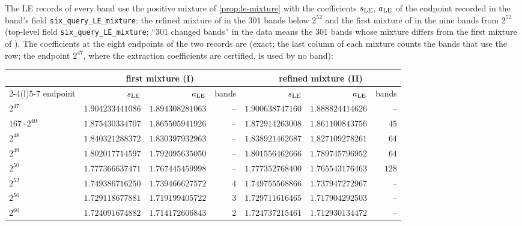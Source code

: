 The LE records of every band use the positive mixture of \cref{prop:le-mixture}
with the coefficients $s_{\rm LE}$, $a_{\rm LE}$ of the endpoint recorded in the
band's field \texttt{six\_query\_LE\_mixture}: the refined mixture of
 in the $301$
bands below $2^{52}$ and the first mixture of  in the nine
bands from $2^{52}$ (top-level field
\texttt{six\_query\_LE\_mixture}; ``$301$ changed bands'' in
the data means the $301$ bands whose mixture differs from the
first mixture of ). The coefficients at the eight endpoints of the two records are (exact; the
last column of each mixture counts the bands that use the row; the endpoint
$2^{47}$, where the extraction coefficients are certified, is used by no band):
\begin{center}\scriptsize\setlength{\tabcolsep}{4pt}
\begin{tabular}{@{}lrrrrrr@{}}
\toprule
 & \multicolumn{3}{c}{first mixture (I)} & \multicolumn{3}{c}{refined mixture (II)}\\
\cmidrule(lr){2-4}\cmidrule(l){5-7}
endpoint & $s_{\rm LE}$ & $a_{\rm LE}$ & bands & $s_{\rm LE}$ & $a_{\rm LE}$ & bands\\
\midrule
$2^{47}$ & $1.904233441086$ & $1.894308281063$ & -- & $1.900638747160$ & $1.888824414626$ & --\\
$167\cdot2^{40}$ & $1.875430334707$ & $1.865505941926$ & -- & $1.872914263008$ & $1.861100843756$ & $45$\\
$2^{48}$ & $1.840321288372$ & $1.830397932963$ & -- & $1.838921462687$ & $1.827109278261$ & $64$\\
$2^{49}$ & $1.802017714597$ & $1.792095635050$ & -- & $1.801556462666$ & $1.789745796952$ & $64$\\
$2^{50}$ & $1.777366637471$ & $1.767445459998$ & -- & $1.777352768400$ & $1.765543176463$ & $128$\\
$2^{52}$ & $1.749386716250$ & $1.739466627572$ & $4$ & $1.749755568866$ & $1.737947272967$ & --\\
$2^{56}$ & $1.729118677881$ & $1.719199405722$ & $3$ & $1.729711616465$ & $1.717904292503$ & --\\
$2^{60}$ & $1.724091674882$ & $1.714172606843$ & $2$ & $1.724737215461$ & $1.712930134472$ & --\\
\bottomrule
\end{tabular}
\end{center}

